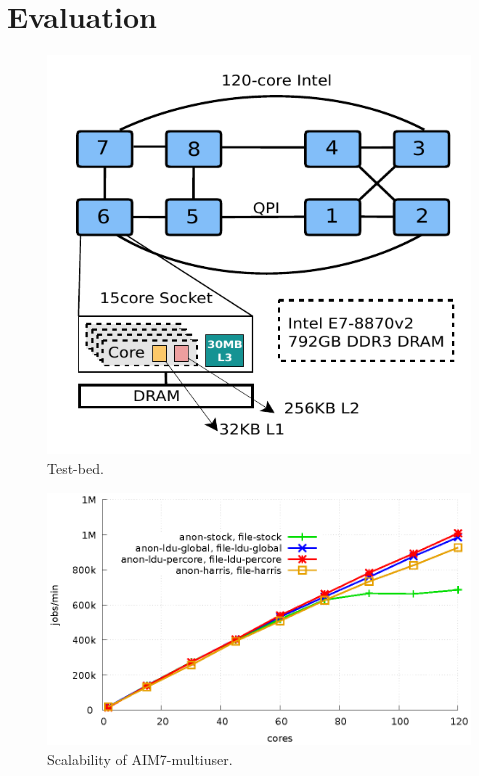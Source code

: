 \newpage

\section{Evaluation}
\label{sec:evaluation}
\begin{figure}[h!]
  \begin{center}
    \includegraphics[scale=1.2]{fig/xeon}
  \end{center}
  \caption{Test-bed.}
  \label{fig:xeon}
\end{figure}


\begin{figure}[tb]
  \begin{center}
    \includegraphics[scale=0.8]{graph/aim7.eps}
  \end{center}
  \caption{Scalability of AIM7-multiuser.}
  \label{fig:aim7}
\end{figure}


